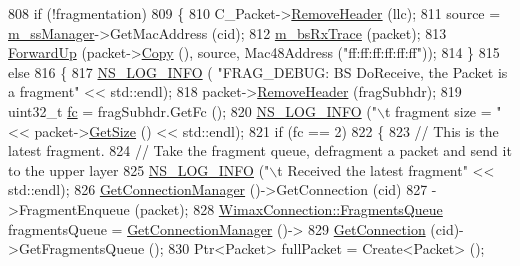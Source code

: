 \begin{DoxyCode}
808           \textcolor{keywordflow}{if} (!fragmentation)
809             \{
810               C\_Packet->\hyperlink{classns3_1_1Packet_a0961eccf975d75f902d40956c93ba63e}{RemoveHeader} (llc);
811               source = \hyperlink{classns3_1_1BaseStationNetDevice_a2365fd053319dda930081e661e6381a6}{m\_ssManager}->GetMacAddress (cid);
812               \hyperlink{classns3_1_1BaseStationNetDevice_aff889426b2009f26312b689ac4015a8d}{m\_bsRxTrace} (packet);
813               \hyperlink{classns3_1_1WimaxNetDevice_ae6d708e65981c36d43f075527b11eb8d}{ForwardUp} (packet->\hyperlink{classns3_1_1Packet_a5d5c70802a5f77fc5f0001e0cfc1898b}{Copy} (), source, Mac48Address (\textcolor{stringliteral}{"ff:ff:ff:ff:ff:ff"}));
814             \}
815           \textcolor{keywordflow}{else}
816             \{
817               \hyperlink{group__logging_gafbd73ee2cf9f26b319f49086d8e860fb}{NS\_LOG\_INFO} ( \textcolor{stringliteral}{"FRAG\_DEBUG: BS DoReceive, the Packet is a fragment"} << std::endl);
818               packet->\hyperlink{classns3_1_1Packet_a0961eccf975d75f902d40956c93ba63e}{RemoveHeader} (fragSubhdr);
819               uint32\_t \hyperlink{generate__test__data__lte__spectrum__model_8m_a72d54db2b27ce046aab6e6a414c407e9}{fc} = fragSubhdr.GetFc ();
820               \hyperlink{group__logging_gafbd73ee2cf9f26b319f49086d8e860fb}{NS\_LOG\_INFO} (\textcolor{stringliteral}{"\(\backslash\)t fragment size = "} << packet->\hyperlink{classns3_1_1Packet_a462855c9929954d4301a4edfe55f4f1c}{GetSize} () << std::endl);
821               \textcolor{keywordflow}{if} (fc == 2)
822                 \{
823                   \textcolor{comment}{// This is the latest fragment.}
824                   \textcolor{comment}{// Take the fragment queue, defragment a packet and send it to the upper layer}
825                   \hyperlink{group__logging_gafbd73ee2cf9f26b319f49086d8e860fb}{NS\_LOG\_INFO} (\textcolor{stringliteral}{"\(\backslash\)t Received the latest fragment"} << std::endl);
826                   \hyperlink{classns3_1_1WimaxNetDevice_a25450b18f62f91e4c2ab08485bd171a2}{GetConnectionManager} ()->GetConnection (cid)
827                   ->FragmentEnqueue (packet);
828                   \hyperlink{classns3_1_1WimaxConnection_acebd6aa95ab519f5e19bd1773f62e506}{WimaxConnection::FragmentsQueue} fragmentsQueue = 
      \hyperlink{classns3_1_1WimaxNetDevice_a25450b18f62f91e4c2ab08485bd171a2}{GetConnectionManager} ()->
829                     \hyperlink{classns3_1_1BaseStationNetDevice_a5a4e5aa9c22b67ebd77dc61281ac8b92}{GetConnection} (cid)->GetFragmentsQueue ();
830                   Ptr<Packet> fullPacket = Create<Packet> ();

\end{DoxyCode}
